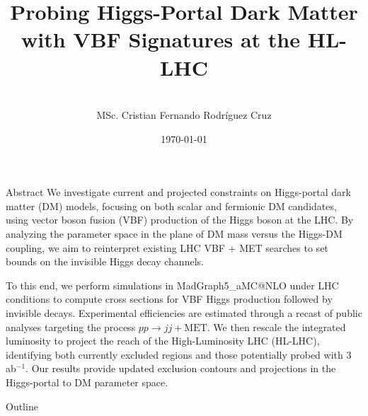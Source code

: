\documentclass{../../bredelebeamer}
\title[Higgs-Portal DM with VBF at HL-LHC]{Probing Higgs-Portal Dark Matter with VBF Signatures at the HL-LHC}
\subtitle{}
\author[C. Rodríguez]{
	\vspace{2em}\\
	MSc. Cristian Fernando Rodríguez Cruz\inst{1}\\
	\vspace{1em}
}
\institute[Uniandes]{\inst{1} Universidad de los Andes\and
}
\date{\today}
\begin{document}
\begin{frame}
    \titlepage
\end{frame}
\begin{frame}{Abstract}
    \justifying
    We investigate current and projected constraints on Higgs-portal dark matter (DM) models, focusing on both scalar and fermionic DM candidates, using vector boson fusion (VBF) production of the Higgs boson at the LHC. By analyzing the parameter space in the plane of DM mass versus the Higgs-DM coupling, we aim to reinterpret existing LHC VBF + MET searches to set bounds on the invisible Higgs decay channels.

    \vfill

    To this end, we perform simulations in MadGraph5\_aMC@NLO under LHC conditions to compute cross sections for VBF Higgs production followed by invisible decays. Experimental efficiencies are estimated through a recast of public analyses targeting the process $pp \to jj + \text{MET}$. We then rescale the integrated luminosity to project the reach of the High-Luminosity LHC (HL-LHC), identifying both currently excluded regions and those potentially probed with 3 ab$^{-1}$. Our results provide updated exclusion contours and projections in the Higgs-portal to DM parameter space.
\end{frame}

\begin{frame}{Outline}
    \tableofcontents
\end{frame}
\end{document}
